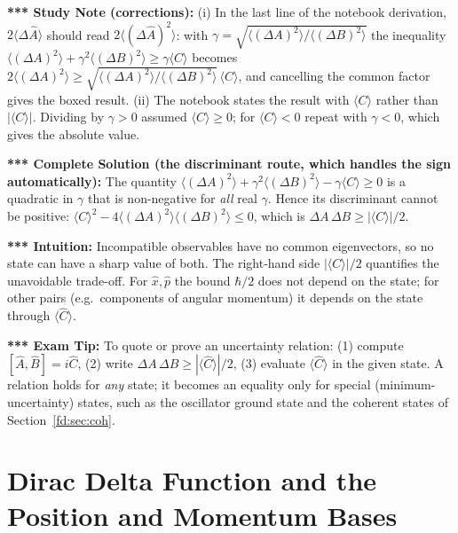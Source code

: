 \documentclass[11pt,a4paper]{article}
\begin{document}
\textbf{*** Study Note (corrections):} (i) In the last line of the notebook derivation, $2\langle\Delta\hat A\rangle$ should read $2\langle(\Delta\hat A)^2\rangle$: with $\gamma=\sqrt{\langle(\Delta A)^2\rangle/\langle(\Delta B)^2\rangle}$ the inequality $\langle(\Delta A)^2\rangle+\gamma^2\langle(\Delta B)^2\rangle\ge\gamma\langle C\rangle$ becomes $2\langle(\Delta A)^2\rangle\ge\sqrt{\langle(\Delta A)^2\rangle/\langle(\Delta B)^2\rangle}\,\langle C\rangle$, and cancelling the common factor gives the boxed result. (ii) The notebook states the result with $\langle C\rangle$ rather than $|\langle C\rangle|$. Dividing by $\gamma>0$ assumed $\langle C\rangle\ge0$; for $\langle C\rangle<0$ repeat with $\gamma<0$, which gives the absolute value.

\textbf{*** Complete Solution (the discriminant route, which handles the sign automatically):} The quantity $\langle(\Delta A)^2\rangle+\gamma^2\langle(\Delta B)^2\rangle-\gamma\langle C\rangle\ge0$ is a quadratic in $\gamma$ that is non-negative for \emph{all} real $\gamma$. Hence its discriminant cannot be positive: $\langle C\rangle^2-4\langle(\Delta A)^2\rangle\langle(\Delta B)^2\rangle\le0$, which is $\Delta A\,\Delta B\ge|\langle C\rangle|/2$.

\textbf{*** Intuition:} Incompatible observables have no common eigenvectors, so no state can have a sharp value of both. The right-hand side $|\langle C\rangle|/2$ quantifies the unavoidable trade-off. For $\hat x,\hat p$ the bound $\hbar/2$ does not depend on the state; for other pairs (e.g.\ components of angular momentum) it depends on the state through $\langle\hat C\rangle$.

\textbf{*** Exam Tip:} To quote or prove an uncertainty relation: (1) compute $[\hat A,\hat B]=i\hat C$, (2) write $\Delta A\,\Delta B\ge|\langle\hat C\rangle|/2$, (3) evaluate $\langle\hat C\rangle$ in the given state. A relation holds for \emph{any} state; it becomes an equality only for special (minimum-uncertainty) states, such as the oscillator ground state and the coherent states of Section~\ref{fd:sec:coh}.
\section{Dirac Delta Function and the Position and Momentum Bases}
\label{fd:sec:delta}
\end{document}
